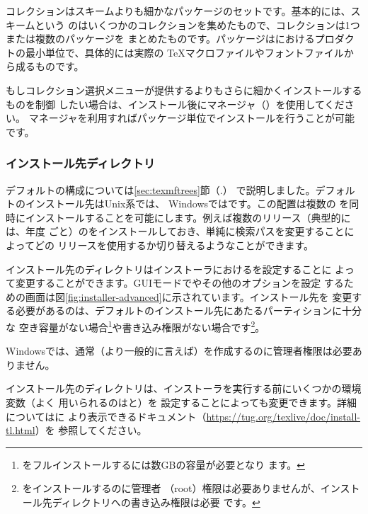 \documentclass[uplatex,dvipdfmx]{jsarticle}
\begin{document}
コレクションはスキームよりも細かなパッケージのセットです。基本的には、スキームという
のはいくつかのコレクションを集めたもので、コレクションは1つまたは複数のパッケージを
まとめたものです。パッケージは\TL におけるプロダクトの最小単位で、具体的には実際の
\TeX マクロファイルやフォントファイルから成るものです。

もしコレクション選択メニューが提供するよりもさらに細かくインストールするものを制御
したい場合は、インストール後に\TL マネージャ（）を使用してください。
\TL マネージャを利用すればパッケージ単位でインストールを行うことが可能です。

\subsubsection{インストール先ディレクトリ}
\label{sec:directories}

デフォルトの\TL 構成については\ref{sec:texmftrees}節（\p.\pageref{sec:texmftrees}）
で説明しました。デフォルトのインストール先はUnix系では、
Windowsではです。この配置は複数の\TL
を同時にインストールすることを可能にします。例えば複数のリリース（典型的には、年度
ごと）の\TL をインストールしておき、単純に検索パスを変更することによってどの
リリースを使用するか切り替えるようなことができます。

インストール先のディレクトリはインストーラにおけるを設定することに
よって変更することができます。GUIモードでやその他のオプションを設定
するための画面は図\ref{fig:installer-advanced}に示されています。インストール先を
変更する必要があるのは、デフォルトのインストール先にあたるパーティションに十分な
空き容量がない場合\footnote{\TL をフルインストールするには数GBの容量が必要となり
ます。}や書き込み権限がない場合です\footnote{\TL をインストールするのに管理者
（root）権限は必要ありませんが、インストール先ディレクトリへの書き込み権限は必要
です。}。

Windowsでは、通常（より一般的に言えば）を作成するのに管理者権限は必要ありません。

インストール先のディレクトリは、インストーラを実行する前にいくつかの環境変数（よく
用いられるのはと）を
設定することによっても変更できます。詳細についてはに
より表示できるドキュメント（\url{https://tug.org/texlive/doc/install-tl.html}）を
参照してください。
\end{document}
